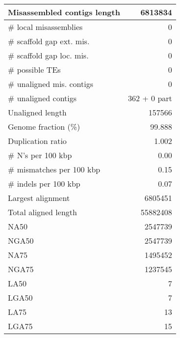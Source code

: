 \documentclass[12pt,a4paper]{article}
\begin{document}
\begin{table}[ht]
\begin{center}
\begin{tabular}{|l*{1}{|r}|}
Misassembled contigs length & 6813834 \\ \hline
\# local misassemblies & 0 \\ \hline
\# scaffold gap ext. mis. & 0 \\ \hline
\# scaffold gap loc. mis. & 0 \\ \hline
\# possible TEs & 0 \\ \hline
\# unaligned mis. contigs & 0 \\ \hline
\# unaligned contigs & 362 + 0 part \\ \hline
Unaligned length & 157566 \\ \hline
Genome fraction (\%) & 99.888 \\ \hline
Duplication ratio & 1.002 \\ \hline
\# N's per 100 kbp & 0.00 \\ \hline
\# mismatches per 100 kbp & 0.15 \\ \hline
\# indels per 100 kbp & 0.07 \\ \hline
Largest alignment & 6805451 \\ \hline
Total aligned length & 55882408 \\ \hline
NA50 & 2547739 \\ \hline
NGA50 & 2547739 \\ \hline
NA75 & 1495452 \\ \hline
NGA75 & 1237545 \\ \hline
LA50 & 7 \\ \hline
LGA50 & 7 \\ \hline
LA75 & 13 \\ \hline
LGA75 & 15 \\ \hline
\end{tabular}
\end{center}
\end{table}
\end{document}
